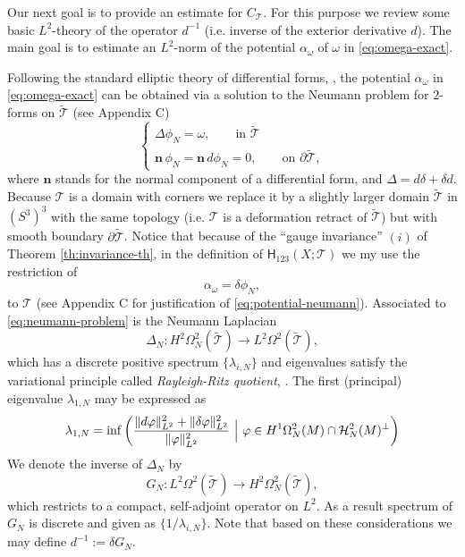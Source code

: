 \documentclass[12pt]{article}
\newcommand{\no}{\noindent}
\begin{document}
Our next goal is to provide an estimate for $C_\mathcal{T}$. For this purpose we review 
some basic $L^2$-theory of the operator $d^{-1}$ (i.e. inverse of the exterior derivative $d$).
The main goal is to estimate an $L^2$-norm of the potential $\alpha_\omega$ of $\omega$ in \eqref{eq:omega-exact}.


Following the standard elliptic theory of differential forms, \cite{Schwarz95}, the potential $\alpha_\omega$ in \eqref{eq:omega-exact} can be obtained via a solution to the Neumann problem for $2$-forms on $\widetilde{\mathcal{T}}$ (see Appendix C)
\begin{equation}\label{eq:neumann-problem}
 \begin{cases}
  \Delta \phi_N=\omega,\qquad \text{in } \widetilde{\mathcal{T}}\\
  \mathbf{n}\,\phi_N=\mathbf{n}\,d\phi_N=0,\qquad \text{on } \partial \widetilde{\mathcal{T}},
 \end{cases}
\end{equation}
where $\mathbf{n}$ stands for the normal component of a differential form, and $\Delta=d\delta+\delta d$.
Because $\mathcal{T}$
is a domain with corners we replace it by a slightly larger domain $\widetilde{\mathcal{T}}$ in $(S^3)^3$ with the same topology 
(i.e. $\mathcal{T}$ is a deformation retract of $\widetilde{\mathcal{T}}$) but with smooth boundary $\partial\widetilde{\mathcal{T}}$.
Notice that because of the ``gauge invariance'' $(i)$ of Theorem \ref{th:invariance-th}, in the definition of $\mathsf{H}_{123}(X;\mathcal{T})$ we my use the restriction of 
\begin{equation}\label{eq:potential-neumann}
\alpha_\omega=\delta\phi_N,
\end{equation}
 to $\mathcal{T}$ (see Appendix C for justification of \eqref{eq:potential-neumann}).
Associated to \eqref{eq:neumann-problem} is the Neumann Laplacian
\[
 \Delta_N:H^2\Omega^2_N(\widetilde{\mathcal{T}})\longrightarrow L^2\Omega^2(\widetilde{\mathcal{T}}),
\] 
which has a discrete positive spectrum $\{\lambda_{i,N}\}$ and eigenvalues satisfy the variational principle called \emph{Rayleigh-Ritz quotient}, \cite{Chavel84}. The first (principal) eigenvalue  $\lambda_{1,N}$ may be expressed as
\[
 \lambda_{1,N}=\inf\left( 	\frac{\|d\varphi\|^2_{L^2}+\|\delta\varphi\|^2_{L^2}}{\|\varphi\|^2_{L^2}}\ \Bigl|\ \varphi\in H^1\Omega^2_N(M)\cap \mathcal{H}^2_N(M)^\perp\right)
\]
\no We denote the inverse of $\Delta_N$ by
\[
 G_N:L^2\Omega^2(\widetilde{\mathcal{T}})\longrightarrow H^2\Omega^2_N(\widetilde{\mathcal{T}}),
\]
which restricts to a compact, self-adjoint operator on $L^2$. As a result spectrum of $G_N$ is 
discrete and given as $\{1/\lambda_{i,N}\}$. Note that based on these considerations we may define $d^{-1}:=\delta G_N$.
\end{document}
